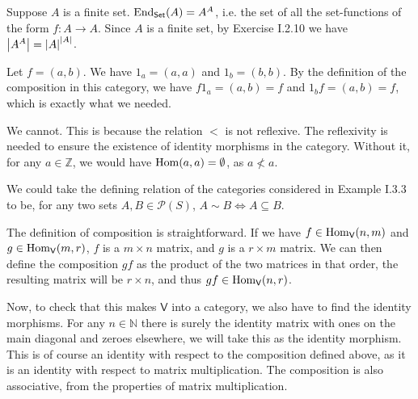 \begin{problem}
\end{problem}

\begin{solution}
	Suppose $A$ is a finite set. $\mathrm{End}_{\mathsf{Set}}(A) = A^A$, i.e. the set of all the set-functions of the form $f: A \to A$. Since $A$ is a finite set, by Exercise I.2.10 we have $\left|A^A\right|=\left|A\right|^{\left|A\right|}$.
\end{solution}

\begin{problem}
\end{problem}

\begin{solution}
	Let $f = (a,b)$. We have $1_a = (a,a)$ and $1_b = (b,b)$. By the definition of the composition in this category, we have $f1_a = (a,b) = f$ and $1_bf = (a,b) = f$, which is exactly what we needed.
\end{solution}

\begin{problem}
\end{problem}

\begin{solution}
	We cannot. This is because the relation $<$ is not reflexive. The reflexivity is needed to ensure the existence of identity morphisms in the category. Without it, for any $a \in \mathbb{Z}$, we would have $\mathrm{Hom}(a,a) = \emptyset$, as $a \not < a$.
\end{solution}

\begin{problem}
\end{problem}

\begin{solution}
	We could take the defining relation of the categories considered in Example I.3.3 to be, for any two sets $A,B \in \mathcal{P}(S)$, $A \sim B \iff A \subseteq B$.
\end{solution}

\begin{problem}
\end{problem}

\begin{solution}
	The definition of composition is straightforward. If we have $f \in \mathrm{Hom}_{\mathsf{V}}(n,m)$ and $g \in \mathrm{Hom}_{\mathsf{V}}(m,r)$, $f$ is a $m \times n$ matrix, and $g$ is a $r \times m$ matrix. We can then define the composition $gf$ as the product of the two matrices in that order, the resulting matrix will be $r \times n$, and thus $gf \in \mathrm{Hom}_{\mathsf{V}}(n,r)$.
	
	Now, to check that this makes $\mathsf{V}$ into a category, we also have to find the identity morphisms. For any $n \in \mathbb{N}$ there is surely the identity matrix with ones on the main diagonal and zeroes elsewhere, we will take this as the identity morphism. This is of course an identity with respect to the composition defined above, as it is an identity with respect to matrix multiplication. The composition is also associative, from the properties of matrix multiplication.
\end{solution}

